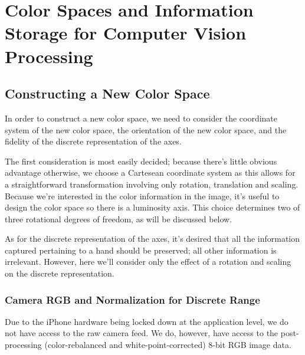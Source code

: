 \newcommand{\unitR}{\text{uR}}
\newcommand{\uR}{\unitR}
\newcommand{\intR}{\text{iR}}
\newcommand{\iR}{\intR}
\newcommand{\discreteR}{\widetilde{\uR}}
\newcommand{\dR}{\discreteR}
\newcommand{\delR}{\delta\uR}
\newcommand{\rRange}{\text{rRange}}  %


\chapter{Color Spaces and Information Storage for Computer Vision Processing} \label{sec:Chap2}

\ifpdf
    \graphicspath{{Chapter2/Figs/Raster/}{Chapter2/Figs/PDF/}{Chapter2/Figs/}}
\else
    \graphicspath{{Chapter2/Figs/Vector/}{Chapter2/Figs/}}
\fi


\section{Constructing a New Color Space}\label{sec:ConstructingANewColorSpace}

In order to construct a new color space, we need to consider the coordinate system of the new color space, the orientation of the new color space, and the fidelity of the discrete representation of the axes.

The first consideration is most easily decided; because there's little obvious advantage otherwise, we choose a Cartesean coordinate system as this allows for a straightforward transformation involving only rotation, translation and scaling. Because we're interested in the color information in the image, it's useful to design the color space so there is a luminosity axis. This choice determines two of three rotational degrees of freedom, as will be discussed below.

As for the discrete representation of the axes, it's desired that all the information captured pertaining to a hand should be preserved; all other information is irrelevant. However, here we'll consider only the effect of a rotation and scaling on the discrete representation.


\subsection{Camera RGB and Normalization for Discrete Range}\label{sec:CameraRGB}

Due to the iPhone hardware being locked down at the application level, we do not have access to the raw camera feed. We do, however, have access to the post-processing (color-rebalanced and white-point-corrected) 8-bit RGB image data.

